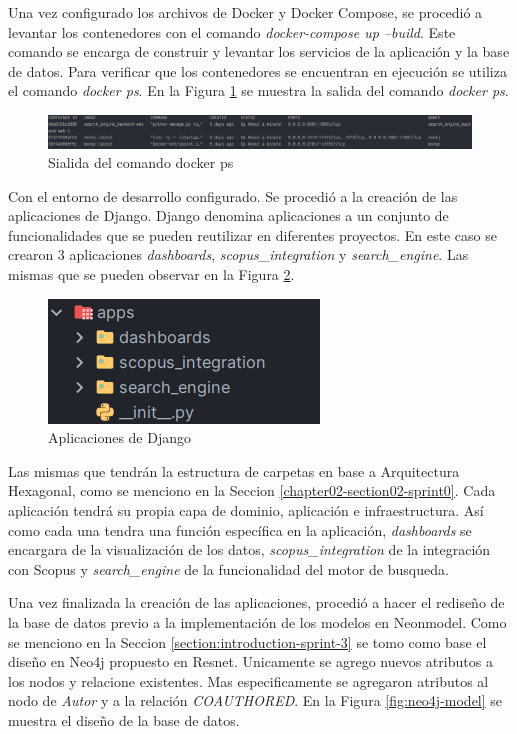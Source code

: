 Una vez configurado los archivos de Docker y Docker Compose,
se procedió a levantar los contenedores con el comando \textit{docker-compose up --build}.
Este comando se encarga de construir y levantar los servicios de la aplicación y la base de datos.
Para verificar que los contenedores se encuentran en ejecución se utiliza el comando \textit{docker ps}.
En la Figura \ref{fig:docker-ps} se muestra la salida del comando \textit{docker ps}.

\begin{figure}[H]
    \centering
    \includegraphics[scale=0.4]{../02Figures/02Chapter/Sprints/Sprint-3/docker-ps.png}
    \caption{Sialida del comando docker ps}
    \label{fig:docker-ps}
\end{figure}

Con el entorno de desarrollo configurado. Se procedió a la creación de las aplicaciones de Django.
Django denomina aplicaciones a un conjunto de funcionalidades que se pueden reutilizar en diferentes proyectos.
En este caso se crearon 3 aplicaciones \textit{dashboards}, \textit{scopus\_integration} y \textit{search\_engine}. Las mismas que se pueden observar en la Figura \ref{fig:django-apps}.
\begin{figure}[H]
    \centering
    \includegraphics[scale=1]{../02Figures/02Chapter/Sprints/Sprint-3/django-apps.png}
    \caption{Aplicaciones de Django}
    \label{fig:django-apps}
\end{figure}

Las mismas que tendrán la estructura de carpetas en base a Arquitectura Hexagonal, como se menciono en la Seccion \ref{chapter02-section02-sprint0}.
Cada aplicación tendrá su propia capa de dominio, aplicación e infraestructura.
Así como cada una tendra una función específica en la aplicación, \textit{dashboards} se encargara de la visualización de los datos, \textit{scopus\_integration} de la integración con Scopus y \textit{search\_engine} de la funcionalidad del motor de busqueda.

Una vez finalizada la creación de las aplicaciones,  procedió a hacer el rediseño de la base de datos
previo a la implementación de los modelos en Neonmodel. Como se menciono en la Seccion \ref{section:introduction-sprint-3} se tomo como base el diseño en Neo4j propuesto en Resnet.
Unicamente se agrego nuevos atributos a los nodos y relacione existentes.
Mas especificamente se agregaron atributos al nodo de \textit{Autor} y a la relación \textit{COAUTHORED}.
En la Figura \ref{fig:neo4j-model} se muestra el diseño de la base de datos.

